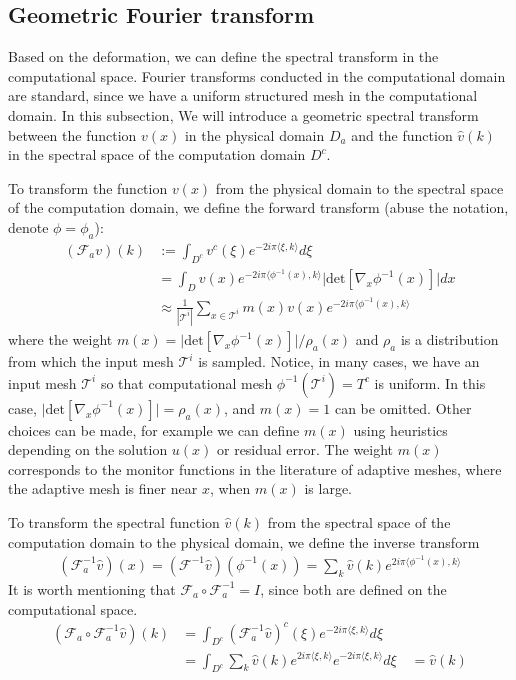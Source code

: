 \documentclass{article}
\newcommand{\F}{\mathcal{F}}
\newcommand{\T}{\mathcal{T}}
\begin{document}
\subsection{Geometric Fourier transform}
Based on the deformation, we can define the spectral transform in the computational space.
Fourier transforms conducted in the computational domain are standard, since we have a uniform structured mesh in the computational domain. In this subsection, We will introduce a geometric spectral transform between the function $v(x)$ in the physical domain $D_a$ and the function $\hat{v}(k)$ in the spectral space of the computation domain $D^c$.

To transform the function $v(x)$ from the physical domain to the spectral space of the computation domain, we define the forward transform (abuse the notation, denote $\phi = \phi_a$):
\begin{align}
    (\F_{a} v)(k) &:= \int_{D^c} v^c(\xi)  e^{- 2i \pi \langle \xi, k\rangle}  d\xi\\
                  &= \int_{D} v(x)  e^{- 2i \pi \langle \phi^{-1}(x), k\rangle}  \lvert\textrm{det}[ \nabla_x \phi^{-1}(x)]\rvert dx \\
                  &\approx \frac{1}{|\T^i|}\sum_{x\in \T^i}  m(x) v(x)  e^{- 2i \pi \langle \phi^{-1}(x), k\rangle} \label{eq:Fa}
\end{align}
where the weight $m(x) = \lvert\textrm{det}[ \nabla_x\phi^{-1}(x)]\rvert / \rho_a(x)$
and $\rho_a$ is a distribution from which the input mesh $\T^i$ is sampled.
Notice, in many cases, we have an input mesh $\T^i$ so that computational mesh $ \phi^{-1}(\T^i) = T^c$ is uniform. In this case, $\lvert\textrm{det}[ \nabla_x\phi^{-1}(x)]\rvert = \rho_a(x)$, and $m(x) = 1$ can be omitted. Other choices can be made, for example we can define
$m(x)$ using heuristics depending on the solution $u(x)$ or residual error. The weight $m(x)$ corresponds to the monitor functions in the literature of adaptive meshes, where the adaptive mesh is finer near $x$,  when $m(x)$ is large.

To transform the spectral function $\hat{v}(k)$ from the spectral space of the computation domain to the physical domain, we define the inverse transform
\begin{align}  \label{eq:iFa}
    (\F^{-1}_{a} \hat{v})(x) = (\F^{-1} \hat{v})(\phi^{-1}(x)) 
                             = \sum_{k}  \hat{v}(k) e^{2i \pi \langle \phi^{-1}(x), k \rangle }
\end{align}
It is worth mentioning that $\F_{a} \circ \F^{-1}_{a} = I$, since both are defined on the computational space.
\begin{align}
    (\F_{a} \circ \F^{-1}_{a} \hat{v})(k) &= \int_{D^c} (\F^{-1}_{a} \hat{v})^c (\xi)  e^{- 2i \pi \langle \xi, k\rangle}  d\xi \\
                                          &= \int_{D^c} \sum_{k}  \hat{v}(k) e^{2i \pi \langle \xi, k \rangle } e^{- 2i \pi \langle \xi, k\rangle}  d\xi
                                       \quad   = \hat{v}(k)
\end{align}
\end{document}
